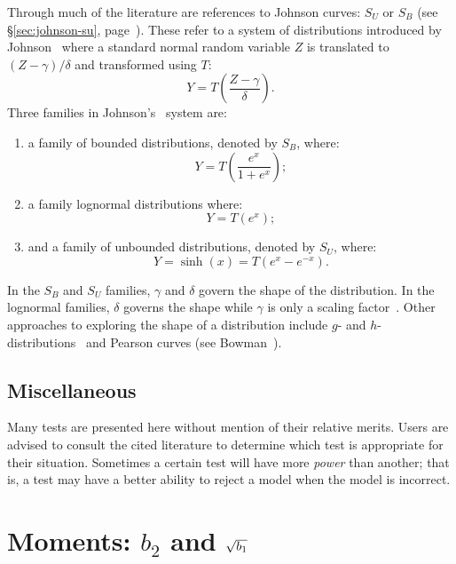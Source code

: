 \documentclass[draft]{article}
\begin{document}
Through much of the literature are references to Johnson
curves: \(S_U\) or \(S_B\) (see \S\ref{sec:johnson-su}, 
page~\pageref{sec:johnson-su}).
These refer to a system of distributions introduced by 
Johnson~\cite{johnson49} where a standard normal random
variable \(Z\) is translated to \(\left(Z-\gamma\right)/\delta\)
and transformed using \(T\):
\begin{equation}
Y=T\left(\frac{Z-\gamma}{\delta}\right).
\end{equation}
Three families in Johnson's~\cite{johnson49} system are:
\begin{enumerate}
\item a family of bounded distributions, denoted by \(S_B\), where:
\begin{equation}
Y=T\left( \frac{e^x}{1+e^x} \right);
\end{equation}
\item a family lognormal distributions where:
\begin{equation}
Y=T\left( e^x \right);
\end{equation}
\item and a family of unbounded distributions, denoted by \(S_U\), where:
\begin{equation}
Y=\sinh\left(x\right) = T\left( e^x-e^{-x} \right).
\end{equation}
\end{enumerate}
In the \(S_B\) and \(S_U\) families, \(\gamma\) and \(\delta\)
govern the shape of the distribution. In the lognormal families,
\(\delta\) governs the shape while \(\gamma\) is only a scaling
factor~\cite{hoaglin85c}. Other approaches to exploring the 
shape of a distribution include \(g\)- and 
\(h\)-distributions~\cite{hoaglin85c} and 
Pearson curves (see Bowman~\cite{bowman86}).

\subsection{Miscellaneous}

Many tests are presented here without mention of their relative
merits. Users are advised to consult the cited literature to
determine which test is appropriate for their situation. Sometimes
a certain test will have more \emph{power} than another; that is,
a test may have a better ability to reject a model when
the model is incorrect. 

\section{Moments: \(b_2\) and \(\protect\sqrt{b_1}\)}
\end{document}
